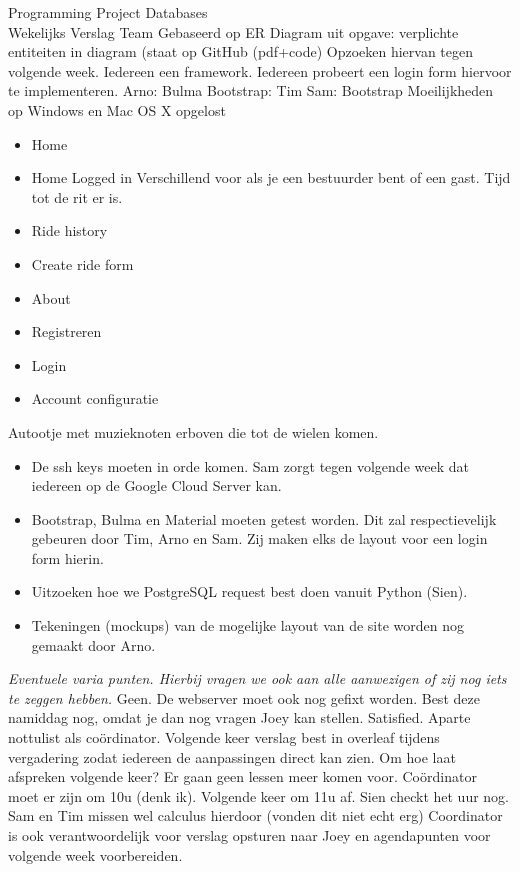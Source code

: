 \documentclass{article}
\newcounter{team}
\begin{document}
\begin{Minutes}{Programming Project Databases \\ Wekelijks Verslag Team }
					Gebaseerd op ER Diagram uit opgave: verplichte entiteiten in diagram (staat op GitHub (pdf+code)
							Opzoeken hiervan tegen volgende week. Iedereen een framework. Iedereen probeert een login form hiervoor te implementeren.
							Arno: Bulma
							Bootstrap: Tim
							Sam: Bootstrap
					Moeilijkheden op Windows en Mac OS X opgelost
					\begin{itemize}
						\item Home
						\item Home Logged in
							Verschillend voor als je een bestuurder bent of een gast. Tijd tot de rit er is. 
						\item Ride history	
						\item Create ride form
						\item About
						\item Registreren
						\item Login 
						\item Account configuratie
					\end{itemize}
					Autootje met muzieknoten erboven die tot de wielen komen.
					
			\begin{itemize}
				\item De ssh keys moeten in orde komen. Sam zorgt tegen volgende week dat iedereen op de Google Cloud Server kan.
				\item Bootstrap, Bulma en Material moeten getest worden. Dit zal respectievelijk gebeuren door Tim, Arno en Sam. Zij maken elks de layout voor een login form hierin.
				\item Uitzoeken hoe we PostgreSQL request best doen vanuit Python (Sien).
				\item Tekeningen (mockups) van de mogelijke layout van de site worden nog gemaakt door Arno.
			\end{itemize}
		
		
			\emph{Eventuele varia punten. Hierbij vragen we ook aan alle aanwezigen of zij nog iets te zeggen hebben.}
					Geen.
					De webserver moet ook nog gefixt worden. Best deze namiddag nog, omdat je dan nog vragen Joey kan stellen. 
					Satisfied.
					Aparte nottulist als co\"ordinator. Volgende keer verslag best in overleaf tijdens vergadering zodat iedereen de aanpassingen direct kan zien.
					Om hoe laat afspreken volgende keer? Er gaan geen lessen meer komen voor. Co\"ordinator moet er zijn om 10u (denk ik). Volgende keer om 11u af. Sien checkt het uur nog. Sam en Tim missen wel calculus hierdoor (vonden dit niet echt erg)
					Coordinator is ook verantwoordelijk voor verslag opsturen naar Joey en agendapunten voor volgende week voorbereiden.
			

\end{Minutes}
\end{document}
